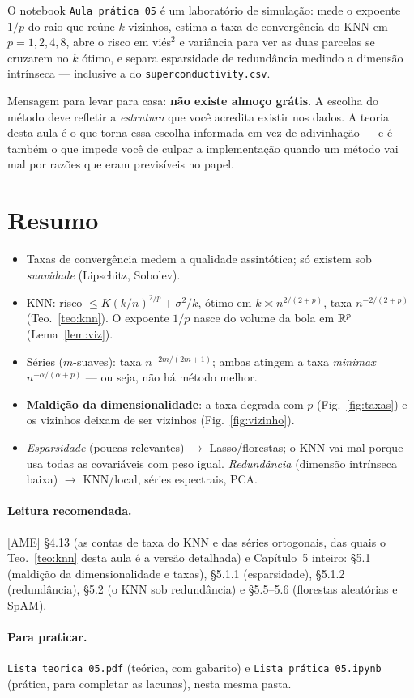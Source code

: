 \documentclass[11pt,a4paper]{article}
\begin{document}
O notebook \texttt{Aula prática 05} é um laboratório de simulação: mede o expoente
$1/p$ do raio que reúne $k$ vizinhos, estima a taxa de convergência do KNN em
$p=1,2,4,8$, abre o risco em viés$^2$ e variância para ver as duas parcelas se
cruzarem no $k$ ótimo, e separa esparsidade de redundância medindo a dimensão
intrínseca --- inclusive a do \texttt{superconductivity.csv}.

\begin{atencao}
Mensagem para levar para casa: \textbf{não existe almoço grátis}. A escolha do
método deve refletir a \emph{estrutura} que você acredita existir nos dados. A
teoria desta aula é o que torna essa escolha informada em vez de adivinhação --- e
é também o que impede você de culpar a implementação quando um método vai mal por
razões que eram previsíveis no papel.
\end{atencao}

\section*{Resumo}
\begin{itemize}[leftmargin=1.4cm]
  \item Taxas de convergência medem a qualidade assintótica; só existem sob
        \emph{suavidade} (Lipschitz, Sobolev).
  \item KNN: risco $\le K(k/n)^{2/p}+\sigma^2/k$, ótimo em
        $k\asymp n^{2/(2+p)}$, taxa $n^{-2/(2+p)}$ (Teo.~\ref{teo:knn}). O expoente
        $1/p$ nasce do volume da bola em $\mathbb{R}^p$ (Lema~\ref{lem:viz}).
  \item Séries ($m$-suaves): taxa $n^{-2m/(2m+1)}$; ambas atingem a taxa
        \emph{minimax} $n^{-\alpha/(\alpha+p)}$ --- ou seja, não há método melhor.
  \item \textbf{Maldição da dimensionalidade}: a taxa degrada com $p$
        (Fig.~\ref{fig:taxas}) e os vizinhos deixam de ser vizinhos
        (Fig.~\ref{fig:vizinho}).
  \item \emph{Esparsidade} (poucas relevantes) $\to$ Lasso/florestas; o KNN vai mal
        porque usa todas as covariáveis com peso igual. \emph{Redundância}
        (dimensão intrínseca baixa) $\to$ KNN/local, séries espectrais, PCA.
\end{itemize}

\paragraph{Leitura recomendada.} [AME] §4.13 (as contas de taxa do KNN e das séries
ortogonais, das quais o Teo.~\ref{teo:knn} desta aula é a versão detalhada) e
Capítulo~5 inteiro: §5.1 (maldição da dimensionalidade e taxas), §5.1.1
(esparsidade), §5.1.2 (redundância), §5.2 (o KNN sob redundância) e
§5.5--5.6 (florestas aleatórias e SpAM).

\paragraph{Para praticar.} \texttt{Lista teorica 05.pdf} (teórica, com gabarito) e \texttt{Lista prática 05.ipynb} (prática, para completar as lacunas), nesta mesma pasta.
\end{document}
